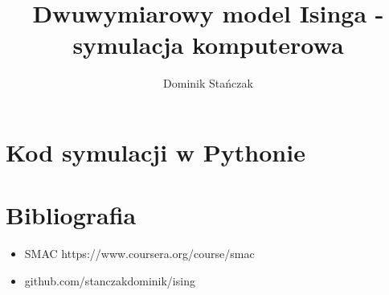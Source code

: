 \documentclass[11pt]{article}
\title{Dwuwymiarowy model Isinga - symulacja komputerowa}
\author{Dominik Stańczak}
\begin{document}
\maketitle

\section{Kod symulacji w Pythonie}


\section{Bibliografia}
  \begin{itemize}
      \item SMAC https://www.coursera.org/course/smac
      \item github.com/stanczakdominik/ising
  \end{itemize}
\end{document}
